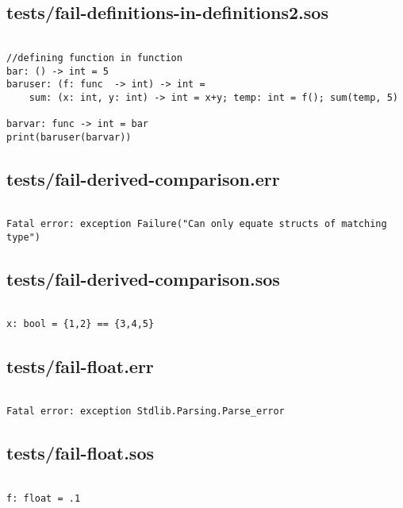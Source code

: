 \documentclass[main.tex]{subfiles}
\begin{document}
\subsection{tests/fail-definitions-in-definitions2.sos}

\begin{lstlisting}

//defining function in function
bar: () -> int = 5
baruser: (f: func  -> int) -> int = 
    sum: (x: int, y: int) -> int = x+y; temp: int = f(); sum(temp, 5)

barvar: func -> int = bar
print(baruser(barvar))
\end{lstlisting}

\subsection{tests/fail-derived-comparison.err}

\begin{lstlisting}

Fatal error: exception Failure("Can only equate structs of matching type")
\end{lstlisting}

\subsection{tests/fail-derived-comparison.sos}

\begin{lstlisting}

x: bool = {1,2} == {3,4,5}
\end{lstlisting}

\subsection{tests/fail-float.err}

\begin{lstlisting}

Fatal error: exception Stdlib.Parsing.Parse_error
\end{lstlisting}

\subsection{tests/fail-float.sos}

\begin{lstlisting}

f: float = .1
\end{lstlisting}
\end{document}
